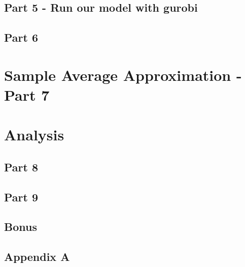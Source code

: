 \documentclass[12pt]{article}
\begin{document}
    \subsection{Part 5 - Run our model with gurobi}
    
    \subsection{Part 6}
    
    \section{Sample Average Approximation - Part 7}
    
    \section{Analysis}
    
    \subsection{Part 8}
    
    \subsection{Part 9}
    
    \subsection{Bonus}
    
	\begin{appendices}
    
        \section{Appendix A}
        
    \end{appendices}
\end{document}
